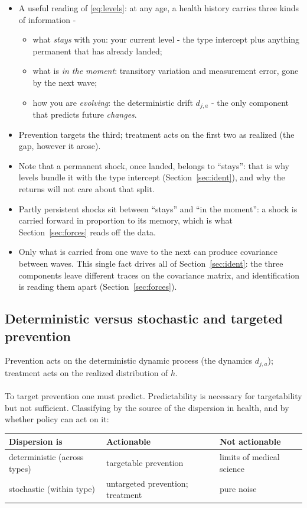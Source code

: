 \documentclass[11pt]{article}
\theoremstyle{remark}
\begin{document}
\begin{itemize}
\item A useful reading of \eqref{eq:levels}: at any age, a health history carries three kinds of information -
  \begin{itemize}
\item what \emph{stays} with you: your current level - the type intercept plus anything permanent that has already landed;
\item what is \emph{in the moment}: transitory variation and measurement error, gone by the next wave;
\item how you are \emph{evolving}: the deterministic drift $d_{j,a}$ - the only component that predicts future \emph{changes}.
  \end{itemize}
\item Prevention targets the third; treatment acts on the first two as realized (the gap, however it arose).
\item Note that a permanent shock, once landed, belongs to ``stays'': that is why levels bundle it with the type intercept (Section~\ref{sec:ident}), and why the returns will not care about that split.
\item Partly persistent shocks sit between ``stays'' and ``in the moment'': a shock is carried forward in proportion to its memory, which is what Section~\ref{sec:forces} reads off the data.
\item Only what is carried from one wave to the next can produce covariance between waves.
This single fact drives all of Section~\ref{sec:ident}: the three components leave different traces on the covariance matrix, and identification is reading them apart (Section~\ref{sec:forces}).
\end{itemize}

\subsection{Deterministic versus stochastic and targeted prevention}\label{sec:detstoch}

Prevention acts on the deterministic dynamic process (the dynamics $d_{j,a}$); treatment acts on the realized distribution of $h$.
\\~\\
To target prevention one must predict. Predictability is necessary for targetability but not sufficient. Classifying by the source of the dispersion in health, and by whether policy can act on it:

\begin{center}
\begin{tabular}{@{}lll@{}}
	\toprule
	\textbf{Dispersion is} & \textbf{Actionable} & \textbf{Not actionable} \\
	\midrule
	deterministic (across types) & targetable prevention & limits of medical science \\
	stochastic (within type) & untargeted prevention; treatment & pure noise \\
	\bottomrule
\end{tabular}
\end{center}
\end{document}
